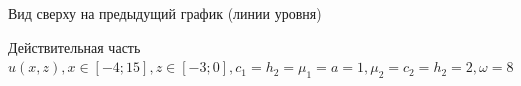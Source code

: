 \documentclass[a4paper, 12pt]{article}
\begin{document}
        \begin{figure}[h!]
            \noindent{}
            \caption{Вид сверху на предыдущий график (линии уровня)}
            \label{figCurves}
            \end{figure} 
    
\begin{figure}[h!]
\noindent{}
\caption{Действительная часть $u(x,z), x \in [-4;15], z\in [-3;0], c_1=h_2=\mu_1=a=1, \mu_2=c_2=h_2=2, \omega=8$}
\label{figCurves}
\end{figure}        
\end{document}
